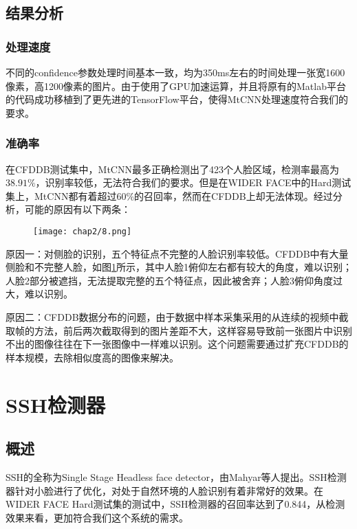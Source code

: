 \subsection{结果分析}

\subsubsection{处理速度}

不同的confidence参数处理时间基本一致，均为350ms左右的时间处理一张宽1600像素，高1200像素的图片。由于使用了GPU加速运算，并且将原有的Matlab平台的代码成功移植到了更先进的TensorFlow平台，使得MtCNN处理速度符合我们的要求。

\subsubsection{准确率}

在CFDDB测试集中，MtCNN最多正确检测出了423个人脸区域，检测率最高为$38.91\%$，识别率较低，无法符合我们的要求。但是在WIDER FACE中的Hard测试集上，MtCNN都有着超过$60\%$的召回率\cite{zhang2016joint}，然而在CFDDB上却无法体现。经过分析，可能的原因有以下两条：

\begin{figure}[!htp]
	\centering
	\texttt{[image: chap2/8.png]}
	\label{fig:mtcnn:accr}
\end{figure}


原因一：对侧脸的识别，五个特征点不完整的人脸识别率较低。CFDDB中有大量侧脸和不完整人脸，如图\ref{fig:mtcnn:accr}所示，其中人脸1俯仰左右都有较大的角度，难以识别；人脸2部分被遮挡，无法提取完整的五个特征点，因此被舍弃；人脸3俯仰角度过大，难以识别。


原因二：CFDDB数据分布的问题，由于数据中样本采集采用的从连续的视频中截取帧的方法，前后两次截取得到的图片差距不大，这样容易导致前一张图片中识别不出的图像往往在下一张图像中一样难以识别。这个问题需要通过扩充CFDDB的样本规模，去除相似度高的图像来解决。

\section{SSH检测器}

\subsection{概述}
SSH的全称为Single Stage Headless face detector\cite{najibi2017ssh}，由Mahyar等人提出。SSH检测器针对小脸进行了优化，对处于自然环境的人脸识别有着非常好的效果。在WIDER FACE Hard测试集的测试中，SSH检测器的召回率达到了0.844，从检测效果来看，更加符合我们这个系统的需求。

